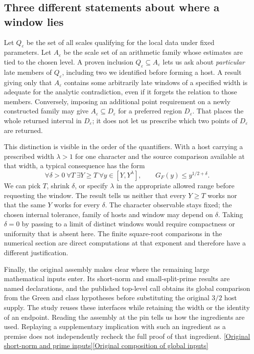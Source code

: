 \documentclass[12pt,letterpaper]{article}
\begin{document}
\subsection{Three different statements about where a window lies}
Let \(Q_\varepsilon\) be the set of all scales qualifying for the local data under fixed parameters. Let \(A_\varepsilon\) be the scale set of an arithmetic family whose estimates are tied to the chosen level. A proven inclusion \(Q_\varepsilon\subseteq A_\varepsilon\) lets us ask about \emph{particular} late members of \(Q_\varepsilon\), including two we identified before forming a host. A result giving only that \(A_\varepsilon\) contains some arbitrarily late windows of a specified width is adequate for the analytic contradiction, even if it forgets the relation to those members. Conversely, imposing an additional point requirement on a newly constructed family may give \(A_\varepsilon\subseteq D_\varepsilon\) for a preferred region \(D_\varepsilon\). That places the whole returned interval in \(D_\varepsilon\); it does not let us prescribe which two points of \(D_\varepsilon\) are returned.

This distinction is visible in the order of the quantifiers. With a host carrying a prescribed width \(\lambda>1\) for one character and the source comparison available at that width, a typical consequence has the form
\[
 \forall\delta>0\ \forall T\ \exists Y\ge T\ \forall y\in[Y,Y^\lambda],
 \qquad G_F(y)\le y^{1/2+\delta}.
\]
We can pick \(T\), shrink \(\delta\), or specify \(\lambda\) in the appropriate allowed range before requesting the window. The result tells us neither that every \(Y\ge T\) works nor that the same \(Y\) works for every \(\delta\). The character observable stays fixed; the chosen internal tolerance, family of hosts and window may depend on \(\delta\). Taking \(\delta=0\) by passing to a limit of distinct windows would require compactness or uniformity that is absent here. The finite square-root comparisons in the numerical section are direct computations at that exponent and therefore have a different justification.

Finally, the original assembly makes clear where the remaining large mathematical inputs enter. Its short-norm and small-split-prime results are named declarations, and the published top-level call obtains its global comparison from the Green and class hypotheses before substituting the original \(3/2\) host supply. The study reuses these interfaces while retaining the width or the identity of an endpoint. Reading the assembly at the pin tells us how the ingredients are used. Replaying a supplementary implication with such an ingredient as a premise does not independently recheck the full proof of that ingredient. \href{https://github.com/nousentllc/riemann-hypothesis/blob/40e56bab026552e089d7afcfeff08d2defb9c005/src/Development/AutomorphicArithmetic/ShortNorms/Primes.lean#L5-L7}{[Original short-norm and prime inputs]}\quad\href{https://github.com/nousentllc/riemann-hypothesis/blob/40e56bab026552e089d7afcfeff08d2defb9c005/src/Development/AutomorphicArithmetic/ThetaCorrespondence/ThetaPairLifts/ThirdPlaceSeries/TopPlug.lean#L12-L16}{[Original composition of global inputs]}
\end{document}
